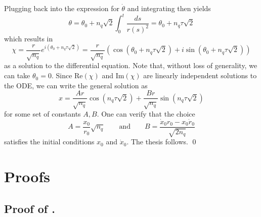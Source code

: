 \documentclass[11pt]{article}
\begin{document}
Plugging back into the expression for $\dot \theta$ and integrating then yields 
\[\theta = \theta_0 +  n_q\sqrt{2}\int_0^t\frac{ds}{r(s)^2} = \theta_0 + n_q\tau\sqrt{2}\]
which results in 
\[\chi = \frac{r}{\sqrt{n_q}}e^{i(\theta_0 + n_q\tau\sqrt{2})} = \frac{r}{\sqrt{n_q}}\left(\cos(\theta_0 + n_q\tau\sqrt{2}) + i\sin(\theta_0 + n_q\tau\sqrt{2})\right)\]
as a solution to the differential equation. Note that, without loss of generality, we can take $\theta_0 = 0$. Since $\text{Re}(\chi)$ and $\text{Im}(\chi)$ are linearly independent solutions to the ODE, we can write the general solution as
\[x = \frac{Ar}{\sqrt{n_q}}\cos(n_q\tau\sqrt{2}) + \frac{Br}{\sqrt{n_q}}\sin( n_q\tau\sqrt{2})\]
for some set of constants $A, B$. One can verify that the choice
\[A = \frac{x_0}{r_0}\sqrt{n_q} \qquad \text{and} \qquad B = \frac{\dot x_0 r_0 - x_0 \dot r_0}{\sqrt{2n_q}}\]
satisfies the initial conditions $x_0$ and $\dot x_0$.  The thesis follows. \qed{}

\section{Proofs} \label{sec: proof of main results}

\subsection{Proof of .} \label{sec: proof of cone exponential and log map}
\end{document}
